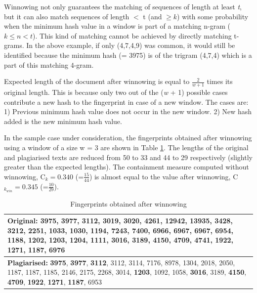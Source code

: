 \documentclass[11pt]{article}
\begin{document}
	 Winnowing not only guarantees the matching of sequences of length at least {\em t}, but it can also match sequences of length $<$ t (and $\geq k$) with some  probability when the minimum hash value in a window is part of a matching n-gram ($k \leq n < t$).  This kind of matching cannot be achieved by directly matching t-grams. In the above example, if only (4,7,4,9) was common, it would still be identified because the minimum hash (= 3975) is of the trigram (4,7,4) which is a part of this matching 4-gram.

	Expected length of the document after winnowing is equal to $\frac{2}{w+1}$ times its original length. This is because only two out of the ({\em  w} + 1) possible cases contribute a new hash to the fingerprint in case of a new window. The cases are: 1) Previous minimum hash value does not occur in the new window. 2) New hash added is the new minimum hash value.
 
 In the sample case under consideration, the fingerprints obtained after winnowing using a window of a size w = 3 are shown in Table \ref{win}. The lengths of the original and plagiarised texts are reduced from 50 to 33 and 44 to 29 respectively (slightly greater than the expected lengths). The containment measure computed without winnowing, C$_{k}=0.340$ (=$\frac{15}{44}$) is almost equal to the value after winnowing, C$_{k_{win}}=0.345$ (=$\frac{10}{29}$).

\begin{table}[h]
\footnotesize
\begin{tabularx}{\columnwidth}{|X|}
\hline
\textbf{Original:} \textbf{3975}, \textbf{3977}, \textbf{3112}, 3019, 3020, 4261, 12942, 13935, 3428, 3212, 2251, 1033, 1030, 1194, 7243, 7400, 6966, 6967, 6967, 6954, 1188, 1202, \textbf{1203}, 1204, 1111, \textbf{3016}, 3189, \textbf{4150}, \textbf{4709}, 4741,\textbf{ 1922}, \textbf{1271}, \textbf{1187}, 6976\\
\hline
\textbf{Plagiarised:} \textbf{3975}, \textbf{3977}, \textbf{3112}, 3112, 3114, 7176, 8978, 1304, 2018, 2050, 1187, 1187, 1185, 2146, 2175, 2268, 3014,\textbf{ 1203}, 1092, 1058, \textbf{3016}, 3189, \textbf{4150}, \textbf{4709}, \textbf{1922}, \textbf{1271}, \textbf{1187}, 6953
\\
\hline
\end{tabularx}
\caption{Fingerprints obtained after winnowing}
 \label{win}
\end{table}
\end{document}
